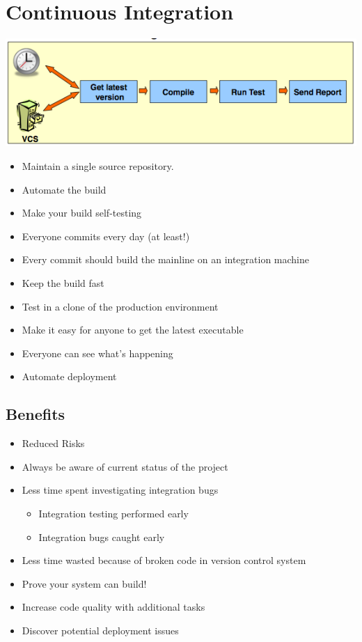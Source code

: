 \documentclass[a4paper,10pt]{article}
\begin{document}
\section{Continuous Integration}
\includegraphics[scale=0.8]{continuous_integration.png}
\begin{itemize}
	\item Maintain a single source repository.
	\item Automate the build
	\item Make your build self-testing
	\item Everyone commits every day (at least!)
	\item Every commit should build the mainline on an integration machine
	\item Keep the build fast
	\item Test in a clone of the production environment	
	\item Make it easy for anyone to get the latest executable
	\item Everyone can see what's happening
	\item Automate deployment
\end{itemize}

\subsection{Benefits}
\begin{itemize}
	\item Reduced Risks
	\item Always be aware of current status of the project
	\item Less time spent investigating integration bugs
		\begin{itemize}
			\item Integration testing performed early
			\item Integration bugs caught early
		\end{itemize}
	\item Less time wasted because of broken code in version control system
	\item Prove your system can build!
	\item Increase code quality with additional tasks
	\item Discover potential deployment issues
\end{itemize}
\end{document}
